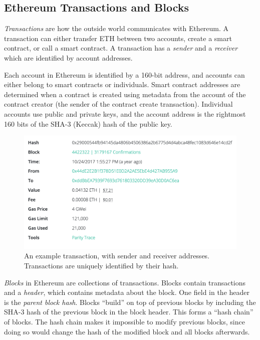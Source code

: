 \documentclass[12pt]{article}
\begin{document}
\subsection{Ethereum Transactions and Blocks}

\emph{Transactions} are how the outside world communicates with Ethereum. A transaction can either transfer ETH between two accounts, create a smart contract, or call a smart contract. A transaction has a \emph{sender} and a \emph{receiver} which are identified by account addresses.

Each account in Ethereum is identified by a 160-bit address, and accounts can either belong to smart contracts or individuals. Smart contract addresses are determined when a contract is created using metadata from the account of the contract creator (the sender of the contract create transaction). Individual accounts use public and private keys, and the account address is the rightmost 160 bits of the SHA-3 (Keccak) hash of the public key. %

\begin{figure}[H]
  \centering
  \includegraphics[width=\textwidth]{../figures/background/transactions/example_transaction.png}
  \caption{An example transaction, with sender and receiver addresses. Transactions are uniquely identified by their hash.}
\end{figure}

\emph{Blocks} in Ethereum are collections of transactions. Blocks contain transactions and a \emph{header}, which contains metadata about the block. One field in the header is the \emph{parent block hash}. Blocks ``build'' on top of previous blocks by including the SHA-3 hash of the previous block in the block header. This forms a ``hash chain'' of blocks. The hash chain makes it impossible to modify previous blocks, since doing so would change the hash of the modified block and all blocks afterwards.
\end{document}

